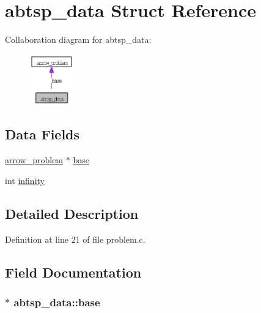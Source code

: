 \hypertarget{structabtsp__data}{
\section{abtsp\_\-data Struct Reference}
\label{structabtsp__data}
}
Collaboration diagram for abtsp\_\-data:\nopagebreak
\begin{figure}[H]
\begin{center}
\leavevmode
\includegraphics[width=55pt]{structabtsp__data__coll__graph}
\end{center}
\end{figure}
\subsection*{Data Fields}
\begin{CompactItemize}
\item 
\hyperlink{structarrow__problem}{arrow\_\-problem} $\ast$ \hyperlink{structabtsp__data_3c0a1b244d72169be516e47dd9138072}{base}
\item 
int \hyperlink{structabtsp__data_574a2f0aaf850223729244a9d2a0a4a5}{infinity}
\end{CompactItemize}


\subsection{Detailed Description}


Definition at line 21 of file problem.c.

\subsection{Field Documentation}
\hypertarget{structabtsp__data_3c0a1b244d72169be516e47dd9138072}{
\subsubsection{$\ast$ {\bf abtsp\_\-data::base}}}
\label{structabtsp__data_3c0a1b244d72169be516e47dd9138072}


